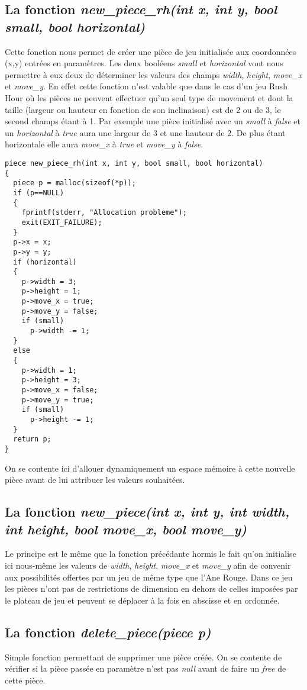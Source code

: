 \documentclass{report}
\begin{document}
\subsection*{La fonction \textit{new\_piece\_rh(int x, int y, bool small, bool horizontal)}}
Cette fonction nous permet de créer une pièce de jeu initialisée aux coordonnées (x,y) entrées en paramètres. Les deux booléens \textit{small} et \textit{horizontal} vont nous permettre à eux deux de déterminer les valeurs des champs \textit{width}, \textit{height}, \textit{move\_x} et \textit{move\_y}. En effet cette fonction n'est valable que dans le cas d'un jeu Rush Hour où les pièces ne peuvent effectuer qu'un seul type de movement et dont la taille (largeur ou hauteur en fonction de son inclinaison) est de 2 ou de 3, le second champs étant à 1. Par exemple une pièce initialisé avec un \textit{small} à \textit{false} et un \textit{horizontal} à \textit{true} aura une largeur de 3 et une hauteur de 2. De plus étant horizontale elle aura \textit{move\_x} à \textit{true} et \textit{move\_y} à \textit{false}.
\begin{lstlisting}
piece new_piece_rh(int x, int y, bool small, bool horizontal)
{
  piece p = malloc(sizeof(*p));
  if (p==NULL)
  {
    fprintf(stderr, "Allocation probleme");
    exit(EXIT_FAILURE);
  }
  p->x = x;
  p->y = y;
  if (horizontal)
  {
    p->width = 3;
    p->height = 1;
    p->move_x = true;
    p->move_y = false;
    if (small)
      p->width -= 1;
  }
  else
  {
    p->width = 1;
    p->height = 3;
    p->move_x = false;
    p->move_y = true;
    if (small)
      p->height -= 1;
  }
  return p;
}
\end{lstlisting}
On se contente ici d'allouer dynamiquement un espace mémoire à cette nouvelle pièce avant de lui attribuer les valeurs souhaitées.
\subsection*{La fonction \textit{new\_piece(int x, int y, int width, int height, bool move\_x, bool move\_y)}}
Le principe est le même que la fonction précédante hormis le fait qu'on initialise ici nous-même les valeurs de \textit{width}, \textit{height}, \textit{move\_x} et \textit{move\_y} afin de convenir aux possibilités offertes par un jeu de même type que l'Ane Rouge. Dans ce jeu les pièces n'ont pas de restrictions de dimension en dehors de celles imposées par le plateau de jeu et peuvent se déplacer à la fois en abscisse et en ordonnée.
\subsection*{La fonction \textit{delete\_piece(piece p)}}
Simple fonction permettant de supprimer une pièce créée. On se contente de vérifier si la pièce passée en paramètre n'est pas \textit{null} avant de faire un \textit{free} de cette pièce.
\end{document}
